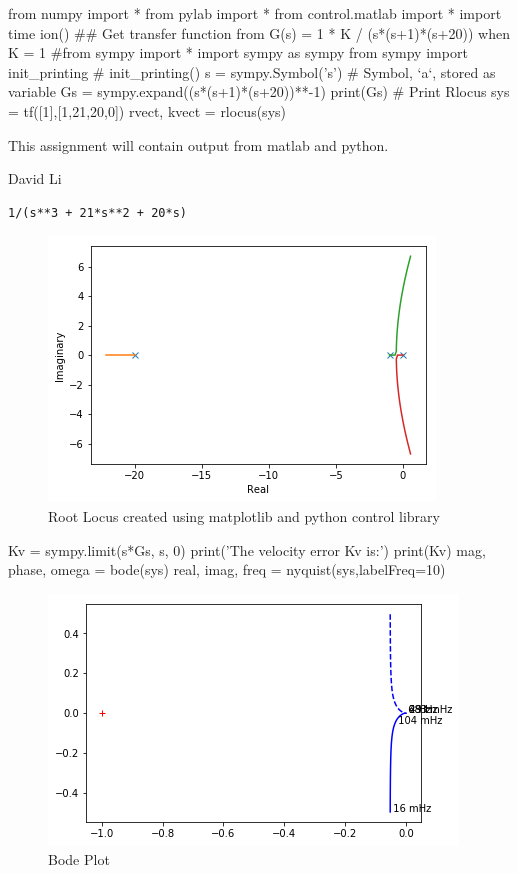 \documentclass{scrreprt}
\theoremstyle{plain}
\theoremstyle{definition}
\theoremstyle{remark}
\begin{document}
\begin{pythonscript}
from numpy import *
from pylab import * 
from control.matlab import *   
import time
ion()
## Get transfer function from G(s) = 1 * K / (s*(s+1)*(s+20)) when K = 1
#from sympy import *
import sympy as sympy
from sympy import init_printing
# %
init_printing()
s = sympy.Symbol('s')  # Symbol, `a`, stored as variable
Gs = sympy.expand((s*(s+1)*(s+20))**-1)
print(Gs)
# Print Rlocus
sys = tf([1],[1,21,20,0])
rvect, kvect = rlocus(sys)
\end{pythonscript}
\epigraph{This assignment will contain output from matlab and python.}{David Li}
\begin{verbatim}
1/(s**3 + 21*s**2 + 20*s)
\end{verbatim}
\begin{figure}
	\includegraphics[width=0.7\linewidth]{Assignments/A1/ipython_files/qt_img486735758753796}
	\caption{Root Locus created using matplotlib and python control library}
	\label{fig:qtimg486735758753796}
\end{figure}
\begin{pythonscript}
	Kv = sympy.limit(s*Gs, s, 0)
	print('The velocity error Kv is:')
	print(Kv)
	mag, phase, omega = bode(sys)
	real, imag, freq = nyquist(sys,labelFreq=10)
\end{pythonscript}

\begin{figure}
	\includegraphics[width=0.7\linewidth]{Assignments/A1/ipython_files/qt_img494204706881540}
	\caption{Bode Plot}
\end{figure}
\end{document}

